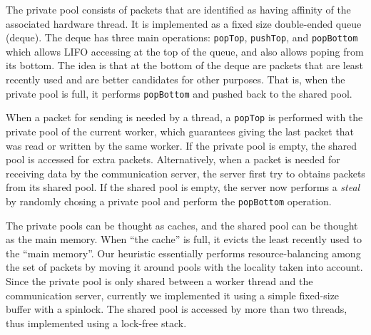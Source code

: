 The private pool consists of packets that are identified as having affinity of
the associated hardware thread. It is implemented as a fixed size double-ended
queue (deque). The deque has three main operations: \texttt{popTop},
\texttt{pushTop}, and \texttt{popBottom} which allows LIFO accessing at the top
of the queue, and also allows poping from its bottom. The idea is that at the
bottom of the deque are packets that are least recently used and are better
candidates for other purposes. That is, when the private pool is full, it
performs \texttt{popBottom} and pushed back to the shared pool.

When a packet for sending is needed by a thread, a \texttt{popTop} is performed
with the private pool of the current worker, which guarantees giving the last
packet that was read or written by the same worker. If the private pool is
empty, the shared pool is accessed for extra packets.  Alternatively, when a
packet is needed for receiving data by the communication server, the server
first try to obtains packets from its shared pool. If the shared pool is empty,
the server now performs a \textit{steal} by randomly chosing a private pool and
perform the \texttt{popBottom} operation.

The private pools can be thought as caches, and the shared pool can be thought
as the main memory. When ``the cache'' is full, it evicts the least recently
used to the ``main memory''. Our heuristic essentially performs
resource-balancing among the set of packets by moving it around pools with the
locality taken into account. Since the private pool is only shared between a
worker thread and the communication server, currently we implemented it using a
simple fixed-size buffer with a spinlock. The shared pool is accessed by more
than two threads, thus implemented using a lock-free stack.
